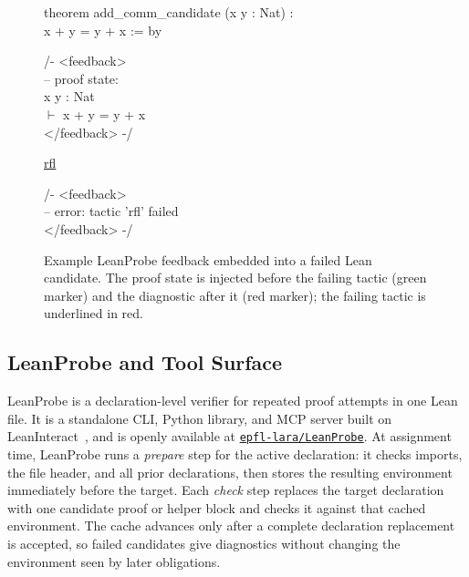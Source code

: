 \documentclass{article}
\newcommand{\lean}{Lean\xspace}
\begin{document}
\begin{figure}[bth]
\centering
\begin{leanexamplebox}[title={LeanProbe feedback on a failed candidate}]
\textcolor{leanKeyword}{theorem} add\_comm\_candidate (x y : \textcolor{leanType}{Nat}) :\\
\hspace*{1.0em}x + y = y + x := \textcolor{leanKeyword}{by}
\begin{leanfeedbackbox}
\textcolor{leanComment}{/- \textless{}feedback\textgreater{}}\\
\textcolor{leanComment}{-- proof state:}\\
x y : \textcolor{leanType}{Nat}\\
\textcolor{leanGoal}{$\vdash$} x + y = y + x\\
\textcolor{leanComment}{\textless{}/feedback\textgreater{} -/}
\end{leanfeedbackbox}
\hspace*{1.0em}\textcolor{leanError}{\underline{rfl}}
\begin{leanerrorbox}
\textcolor{leanComment}{/- \textless{}feedback\textgreater{}}\\
\textcolor{leanComment}{--} \textcolor{leanError}{error: tactic 'rfl' failed}\\
\textcolor{leanComment}{\textless{}/feedback\textgreater{} -/}
\end{leanerrorbox}
\end{leanexamplebox}
\caption{Example LeanProbe feedback embedded into a failed \lean candidate. The proof state is injected before the failing tactic (green marker) and the diagnostic after it (red marker); the failing tactic is underlined in red.}
\label{fig:leanprobe-feedback}
\end{figure}

\subsection{LeanProbe and Tool Surface}
\label{sec:leanprobe-tools}

LeanProbe is a declaration-level verifier for repeated proof attempts in one \lean file.
It is a standalone CLI, Python library, and MCP server built on LeanInteract~\citep{leaninteract2025}, and is openly available at \href{https://github.com/epfl-lara/LeanProbe}{\texttt{epfl-lara/LeanProbe}}.
At assignment time, LeanProbe runs a \emph{prepare} step for the active declaration: it checks imports, the file header, and all prior declarations, then stores the resulting environment immediately before the target.
Each \emph{check} step replaces the target declaration with one candidate proof or helper block and checks it against that cached environment.
The cache advances only after a complete declaration replacement is accepted, so failed candidates give diagnostics without changing the environment seen by later obligations.
\end{document}
